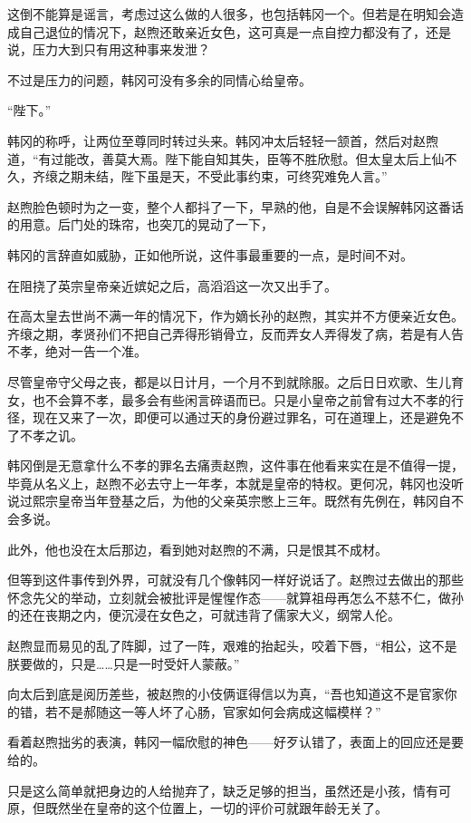 这倒不能算是谣言，考虑过这么做的人很多，也包括韩冈一个。但若是在明知会造成自己退位的情况下，赵煦还敢亲近女色，这可真是一点自控力都没有了，还是说，压力大到只有用这种事来发泄？

不过是压力的问题，韩冈可没有多余的同情心给皇帝。

“陛下。”

韩冈的称呼，让两位至尊同时转过头来。韩冈冲太后轻轻一颔首，然后对赵煦道，“有过能改，善莫大焉。陛下能自知其失，臣等不胜欣慰。但太皇太后上仙不久，齐缞之期未结，陛下虽是天，不受此事约束，可终究难免人言。”

赵煦脸色顿时为之一变，整个人都抖了一下，早熟的他，自是不会误解韩冈这番话的用意。后门处的珠帘，也突兀的晃动了一下，

韩冈的言辞直如威胁，正如他所说，这件事最重要的一点，是时间不对。

在阻挠了英宗皇帝亲近嫔妃之后，高滔滔这一次又出手了。

在高太皇去世尚不满一年的情况下，作为嫡长孙的赵煦，其实并不方便亲近女色。齐缞之期，孝贤孙们不把自己弄得形销骨立，反而弄女人弄得发了病，若是有人告不孝，绝对一告一个准。

尽管皇帝守父母之丧，都是以日计月，一个月不到就除服。之后日日欢歌、生儿育女，也不会算不孝，最多会有些闲言碎语而已。只是小皇帝之前曾有过大不孝的行径，现在又来了一次，即便可以通过天的身份避过罪名，可在道理上，还是避免不了不孝之讥。

韩冈倒是无意拿什么不孝的罪名去痛责赵煦，这件事在他看来实在是不值得一提，毕竟从名义上，赵煦不必去守上一年孝，本就是皇帝的特权。更何况，韩冈也没听说过熙宗皇帝当年登基之后，为他的父亲英宗憋上三年。既然有先例在，韩冈自不会多说。

此外，他也没在太后那边，看到她对赵煦的不满，只是恨其不成材。

但等到这件事传到外界，可就没有几个像韩冈一样好说话了。赵煦过去做出的那些怀念先父的举动，立刻就会被批评是惺惺作态——就算祖母再怎么不慈不仁，做孙的还在丧期之内，便沉浸在女色之，可就违背了儒家大义，纲常人伦。

赵煦显而易见的乱了阵脚，过了一阵，艰难的抬起头，咬着下唇，“相公，这不是朕要做的，只是……只是一时受奸人蒙蔽。”

向太后到底是阅历差些，被赵煦的小伎俩诓得信以为真，“吾也知道这不是官家你的错，若不是郝随这一等人坏了心肠，官家如何会病成这幅模样？”

看着赵煦拙劣的表演，韩冈一幅欣慰的神色——好歹认错了，表面上的回应还是要给的。

只是这么简单就把身边的人给抛弃了，缺乏足够的担当，虽然还是小孩，情有可原，但既然坐在皇帝的这个位置上，一切的评价可就跟年龄无关了。

